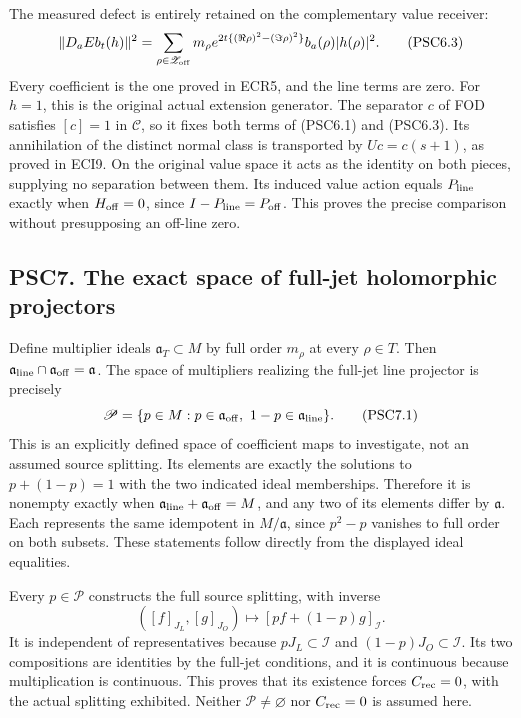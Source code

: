The measured defect is entirely retained on the complementary value
receiver: \[
\|D_aEb_t(h)\|^2
=\sum_{\rho\in\mathscr Z_{\rm off}}m_\rho
e^{2t\{(\Re\rho)^2-(\Im\rho)^2\}}
b_a(\rho)|h(\rho)|^2.
\tag{PSC6.3}
\] Every coefficient is the one proved in ECR5, and the line terms are
zero. For \(h=1\), this is the original actual extension generator. The
separator \(c\) of FOD satisfies \([c]=1\) in \(\mathscr C\), so it
fixes both terms of (PSC6.1) and (PSC6.3). Its annihilation of the
distinct normal class is transported by \(Uc=c(s+1)\), as proved in
ECI9. On the original value space it acts as the identity on both
pieces, supplying no separation between them. Its induced value action
equals \(P_{\rm line}\) exactly when \(H_{\rm off}=0\), since
\(I-P_{\rm line}=P_{\rm off}\). This proves the precise comparison
without presupposing an off-line zero.

\subsection{PSC7. The exact space of full-jet holomorphic
projectors}\label{psc7.-the-exact-space-of-full-jet-holomorphic-projectors}

Define multiplier ideals \(\mathfrak a_T\subset M\) by full order
\(m_\rho\) at every \(\rho\in T\). Then
\(\mathfrak a_{\rm line}\cap\mathfrak a_{\rm off}=\mathfrak a\). The
space of multipliers realizing the full-jet line projector is precisely
\[
\mathscr P=\{p\in M:p\in\mathfrak a_{\rm off},\ 1-p\in\mathfrak a_{\rm line}\}.
\tag{PSC7.1}
\] This is an explicitly defined space of coefficient maps to
investigate, not an assumed source splitting. Its elements are exactly
the solutions to \(p+(1-p)=1\) with the two indicated ideal memberships.
Therefore it is nonempty exactly when
\(\mathfrak a_{\rm line}+\mathfrak a_{\rm off}=M\), and any two of its
elements differ by \(\mathfrak a\). Each represents the same idempotent
in \(M/\mathfrak a\), since \(p^2-p\) vanishes to full order on both
subsets. These statements follow directly from the displayed ideal
equalities.

Every \(p\in\mathscr P\) constructs the full source splitting, with
inverse \[
([f]_{J_L},[g]_{J_O})\longmapsto[pf+(1-p)g]_{\mathcal I}.
\tag{PSC7.2}
\] It is independent of representatives because
\(pJ_L\subset\mathcal I\) and \((1-p)J_O\subset\mathcal I\). Its two
compositions are identities by the full-jet conditions, and it is
continuous because multiplication is continuous. This proves that its
existence forces \(C_{\rm rec}=0\), with the actual splitting exhibited.
Neither \(\mathscr P\ne\varnothing\) nor \(C_{\rm rec}=0\) is assumed
here.

